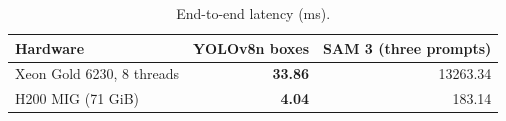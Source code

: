 \begin{table}[H]
\caption{End-to-end latency (ms).}\label{tab:inference-cost}
\centering\small
\begin{tabular}{lrr}
\toprule Hardware & YOLOv8n boxes & SAM 3 (three prompts)\\\midrule
Xeon Gold 6230, 8 threads & \textbf{33.86} & 13263.34\\
H200 MIG (71 GiB) & \textbf{4.04} & 183.14\\
\bottomrule\end{tabular}
\end{table}
